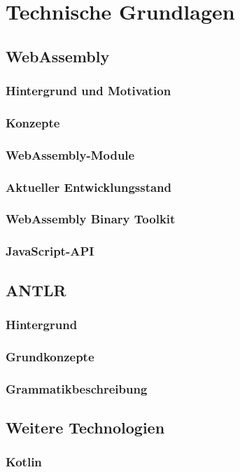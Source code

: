 \chapter{Technische Grundlagen}

\section{WebAssembly}
\subsection{Hintergrund und Motivation}
\subsection{Konzepte}
\subsection{WebAssembly-Module}
\subsection{Aktueller Entwicklungsstand}
\subsection{WebAssembly Binary Toolkit}
\subsection{JavaScript-API}

\section{ANTLR}
\subsection{Hintergrund}
\subsection{Grundkonzepte}
\subsection{Grammatikbeschreibung}

\section{Weitere Technologien}
\subsection{Kotlin}
